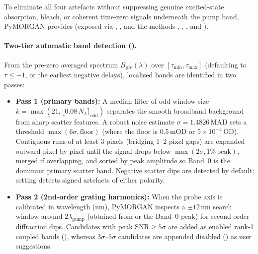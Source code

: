 To eliminate all four artefacts without suppressing genuine excited-state
absorption, bleach, or coherent time-zero signals underneath the pump band,
PyMORGAN provides  (exposed via
, , and the
 methods , ,
, and ).

\paragraph{Two-tier automatic band detection ().}
From the pre-zero averaged spectrum $B_{\mathrm{pre}}(\lambda)$ over
$[\tau_{\mathrm{min}}, \tau_{\mathrm{max}}]$ (defaulting to $\tau \le -1$, or
the earliest negative delays), localised bands are identified in two passes:
\begin{itemize}
  \item \textbf{Pass 1 (primary bands):} A median filter of odd window size
        $k = \max(21, \lfloor 0.08\,N_{\lambda} \rceil_{\mathrm{odd}})$ separates
        the smooth broadband background from sharp scatter features. A robust
        noise estimate $\sigma = 1.4826\,\mathrm{MAD}$ sets a threshold
        $\max(6\sigma, \text{floor})$ (where the floor is $0.5\,\mathrm{mOD}$ or
        $5 \times 10^{-4}\,\mathrm{OD}$). Contiguous runs of at least $3$ pixels
        (bridging 1--2 pixel gaps) are expanded outward pixel by pixel until the
        signal drops below $\max(2\sigma, 1\%\,\text{peak})$, merged if
        overlapping, and sorted by peak amplitude so Band~0 is the dominant
        primary scatter band. Negative scatter dips are detected by default;
        setting  detects signed artefacts of either
        polarity.
  \item \textbf{Pass 2 (2nd-order grating harmonics):} When the probe axis is
        calibrated in wavelength ($\mathrm{nm}$), PyMORGAN inspects a
        $\pm 12\,\mathrm{nm}$ search window around $2\lambda_{\mathrm{pump}}$
        (obtained from  or the Band~0
        peak) for second-order diffraction dips. Candidates with peak
        $\mathrm{SNR} \ge 5\sigma$ are added as enabled rank-1 coupled bands
        (), whereas $3\sigma\text{--}5\sigma$ candidates are
        appended disabled () as user suggestions.
\end{itemize}

